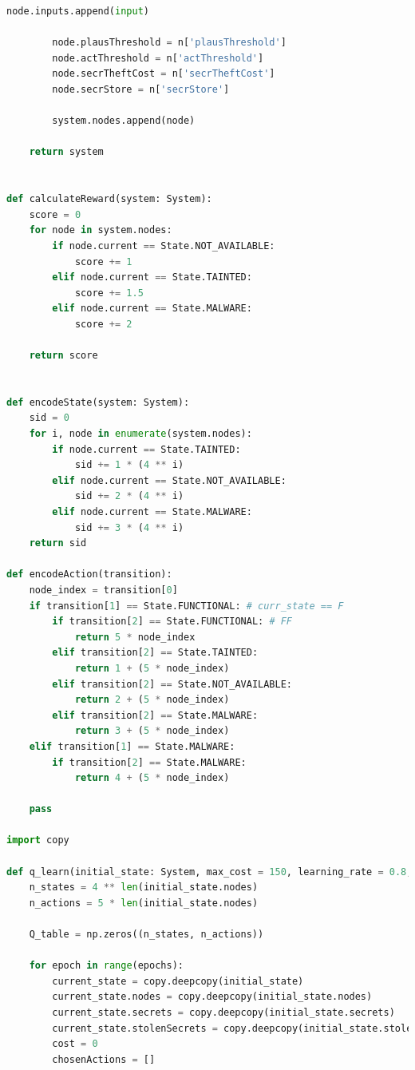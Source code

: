 \documentclass[a4paper]{article}
\begin{document}
\begin{appendices}
\begin{lstlisting}[language=python]
            node.inputs.append(input)

        node.plausThreshold = n['plausThreshold']
        node.actThreshold = n['actThreshold']
        node.secrTheftCost = n['secrTheftCost']
        node.secrStore = n['secrStore']

        system.nodes.append(node)

    return system


def calculateReward(system: System):
    score = 0 
    for node in system.nodes:
        if node.current == State.NOT_AVAILABLE:
            score += 1
        elif node.current == State.TAINTED:
            score += 1.5
        elif node.current == State.MALWARE:
            score += 2

    return score


def encodeState(system: System):
    sid = 0
    for i, node in enumerate(system.nodes):
        if node.current == State.TAINTED:
            sid += 1 * (4 ** i)
        elif node.current == State.NOT_AVAILABLE:
            sid += 2 * (4 ** i)
        elif node.current == State.MALWARE:
            sid += 3 * (4 ** i)
    return sid

def encodeAction(transition):
    node_index = transition[0]
    if transition[1] == State.FUNCTIONAL: # curr_state == F 
        if transition[2] == State.FUNCTIONAL: # FF 
            return 5 * node_index
        elif transition[2] == State.TAINTED:
            return 1 + (5 * node_index)
        elif transition[2] == State.NOT_AVAILABLE:
            return 2 + (5 * node_index)
        elif transition[2] == State.MALWARE:
            return 3 + (5 * node_index)
    elif transition[1] == State.MALWARE:
        if transition[2] == State.MALWARE:
            return 4 + (5 * node_index)
        
    pass
    
import copy

def q_learn(initial_state: System, max_cost = 150, learning_rate = 0.8, discount_factor = 0.95, exploration_prob = 0.2, epochs = 10000):
    n_states = 4 ** len(initial_state.nodes)
    n_actions = 5 * len(initial_state.nodes)

    Q_table = np.zeros((n_states, n_actions))

    for epoch in range(epochs):
        current_state = copy.deepcopy(initial_state)
        current_state.nodes = copy.deepcopy(initial_state.nodes)
        current_state.secrets = copy.deepcopy(initial_state.secrets)
        current_state.stolenSecrets = copy.deepcopy(initial_state.stolenSecrets)
        cost = 0
        chosenActions = []


\end{lstlisting}
\end{appendices}
\end{document}
